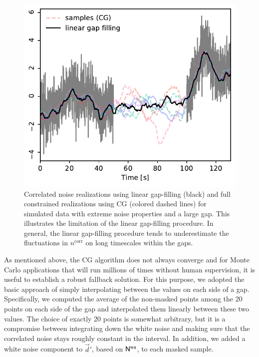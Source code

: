 \documentclass{aa}
\newcommand{\N}[0]{\tens{N}}
\begin{document}
\begin{figure}
        \begin{center}
                \includegraphics[width=\linewidth]{figs/gap_filling_bias.pdf}
        \end{center}
        \caption{Correlated noise
                realizations using linear gap-filling (black) and full constrained realizations using CG
                (colored dashed lines) for simulated data with extreme noise
                properties and a large gap. This illustrates the limitation of the linear
          gap-filling procedure. In general, the linear
          gap-filling procedure tends to underestimate the
          fluctuations in $n^\mathrm{corr}$ on long timescales within the gaps.}
        \label{fig:bias}
\end{figure}

As mentioned above, the CG algorithm does not always converge and for
Monte Carlo applications that will run millions of times without human
supervision, it is useful to establish a robust fallback solution. For
this purpose, we adopted the basic approach of simply interpolating
between the values on each side of a gap. Specifically, we computed the
average of the non-masked points among the 20 points on each side of
the gap and interpolated them linearly between these two values. The choice of exactly 20 points is somewhat arbitrary, but it is a compromise between integrating down the white noise and making sure that the correlated noise stays roughly constant in the interval. In
addition, we added a white noise component to $\vec{d}'$, based on
$\N^{\mathrm{wn}}$, to each masked sample.
\end{document}
